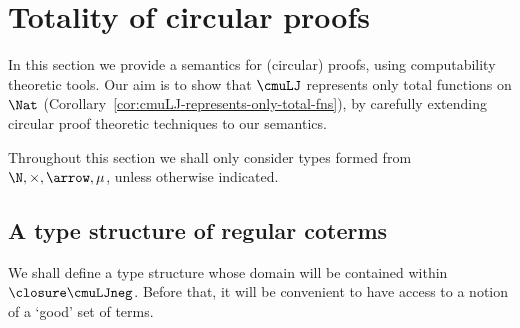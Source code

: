 \section{Totality of circular proofs}
\label{sec:totality}





In this section we provide a semantics for (circular) proofs, using computability theoretic tools.
Our aim is to show that $\cmuLJ$ represents only total functions on $\Nat$ (Corollary~\ref{cor:cmuLJ-represents-only-total-fns}), by carefully extending circular proof theoretic techniques to our semantics.

Throughout this section we shall only consider types formed from $\N, \times, \arrow, \mu$, unless otherwise indicated.

\subsection{A type structure of regular coterms}
We shall define a type structure whose domain will be contained within $\closure \cmuLJneg$. 
Before that, it will be convenient to have access to a notion of a `good' set of terms.
% 


